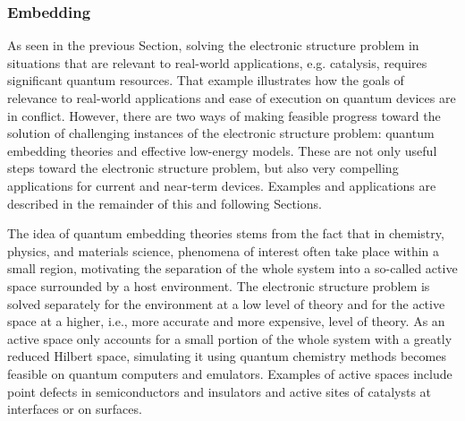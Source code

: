\subsubsection{Embedding}
\label{embedding_sec}

As seen in the previous Section, solving the electronic structure problem in situations that are relevant to real-world applications, e.g. catalysis, requires significant quantum resources.
That example illustrates how the goals of relevance to real-world applications and ease of execution on quantum devices are in conflict.
However, there are two ways of making feasible progress toward the solution of challenging instances of the electronic structure problem: quantum embedding theories and effective low-energy models. 
These are not only useful steps toward the electronic structure problem, but also very compelling applications for current and near-term devices. Examples and applications are described in the remainder of this and following Sections.

The idea of quantum embedding theories stems from the fact that in chemistry, physics, and materials science, phenomena of interest often take place within a small region, motivating the separation of the whole system into a so-called active space surrounded by a host environment. The electronic structure problem is solved separately for the environment at a low level of theory and for the active space at a higher, i.e., more accurate and more expensive, level of theory. As an active space only accounts for a small portion of the whole system with a greatly reduced Hilbert space, simulating it using quantum chemistry methods becomes feasible on quantum computers and emulators. Examples of active spaces include point defects in semiconductors and insulators and active sites of catalysts at interfaces or on surfaces.

